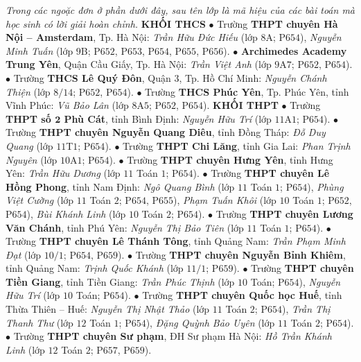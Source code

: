 \begin{multicols}{2}
	\textit{Trong các ngoặc đơn ở phần dưới đây, sau tên lớp là mã hiệu của các bài toán mà học sinh có lời giải hoàn chỉnh.}
	\vskip 0.05cm
	\textbf{\color{thachthuctoanhoc}KHỐI THCS}
	\vskip 0.05cm
	$\bullet$ Trường \textbf{\color{thachthuctoanhoc}THPT chuyên Hà Nội -- Amsterdam}, Tp. Hà Nội: \textit{Trần Hữu Đức Hiếu} (lớp $8$A; P$654$), \textit{Nguyễn Minh Tuấn} (lớp $9$B; P$652$, P$653$, P$654$, P$655$, P$656$).
	\vskip 0.05cm
	$\bullet$ \textbf{\color{thachthuctoanhoc}Archimedes Academy Trung Yên}, Quận Cầu Giấy, Tp. Hà Nội: \textit{Trần Việt Anh} (lớp $9$A$7$; P$652$, P$654$).
	\vskip 0.05cm
	$\bullet$ Trường \textbf{\color{thachthuctoanhoc}THCS Lê Quý Đôn}, Quận $3$, Tp. Hồ Chí Minh: \textit{Nguyễn Chánh Thiện} (lớp $8/14$; P$652$, P$654$).
	\vskip 0.05cm
	$\bullet$ Trường \textbf{\color{thachthuctoanhoc}THCS Phúc Yên}, Tp. Phúc Yên, tỉnh Vĩnh Phúc: \textit{Vũ Bảo Lân} (lớp $8$A$5$; P$652$, P$654$).
	\vskip 0.05cm
	\textbf{\color{thachthuctoanhoc}KHỐI THPT}
	\vskip 0.05cm
	$\bullet$ Trường \textbf{\color{thachthuctoanhoc}THPT số $\pmb{2}$ Phù Cát}, tỉnh Bình Định: \textit{Nguyễn Hữu Trí} (lớp $11$A$1$; P$654$).
	\vskip 0.05cm
	$\bullet$ Trường \textbf{\color{thachthuctoanhoc}THPT chuyên Nguyễn Quang Diêu}, tỉnh Đồng Tháp: \textit{Đỗ Duy Quang} (lớp $11$T$1$; P$654$).
	\vskip 0.05cm
	$\bullet$ Trường \textbf{\color{thachthuctoanhoc}THPT Chi Lăng}, tỉnh Gia Lai: \textit{Phan Trịnh Nguyên} (lớp $10$A$1$; P$654$).
	\vskip 0.05cm
	$\bullet$ Trường \textbf{\color{thachthuctoanhoc}THPT chuyên Hưng Yên}, tỉnh Hưng Yên: \textit{Trần Hữu Dương} (lớp $11$ Toán $1$; P$654$).
	\vskip 0.05cm
	$\bullet$ Trường \textbf{\color{thachthuctoanhoc}THPT chuyên Lê Hồng Phong}, tỉnh Nam Định: \textit{Ngô Quang Bình} (lớp $11$ Toán $1$; P$654$), \textit{Phùng Việt Cường} (lớp $11$ Toán $2$; P$654$, P$655$), \textit{Phạm Tuấn Khôi} (lớp $10$ Toán $1$; P$652$, P$654$), \textit{Bùi Khánh Linh} (lớp $10$ Toán $2$; P$654$).
	\vskip 0.05cm
	$\bullet$ Trường \textbf{\color{thachthuctoanhoc}THPT chuyên Lương Văn Chánh}, tỉnh Phú Yên: \textit{Nguyễn Thị Bảo Tiên} (lớp $11$ Toán $1$; P$654$).
	\vskip 0.05cm
	$\bullet$ Trường \textbf{\color{thachthuctoanhoc}THPT chuyên Lê Thánh Tông}, tỉnh Quảng Nam: \textit{Trần Phạm Minh Đạt} (lớp $10/1$; P$654$, P$659$).
	\vskip 0.05cm
	$\bullet$ Trường \textbf{\color{thachthuctoanhoc}THPT chuyên Nguyễn Bỉnh Khiêm}, tỉnh Quảng Nam: \textit{Trịnh Quốc Khánh} (lớp $11/1$; P$659$).
	\vskip 0.05cm
	$\bullet$ Trường \textbf{\color{thachthuctoanhoc}THPT chuyên Tiền Giang}, tỉnh Tiền Giang: \textit{Trần Phúc Thịnh} (lớp $10$ Toán; P$654$), \textit{Nguyễn Hữu Trí} (lớp $10$ Toán; P$654$).
	\vskip 0.05cm
	$\bullet$ Trường \textbf{\color{thachthuctoanhoc}THPT chuyên Quốc học Huế}, tỉnh Thừa Thiên -- Huế: \textit{Nguyễn Thị Nhật Thảo} (lớp $11$ Toán $2$; P$654$), \textit{Trần Thị Thanh Thư} (lớp $12$ Toán $1$; P$654$), \textit{Đặng Quỳnh Bảo Uyên} (lớp $11$ Toán $2$; P$654$).
	\vskip 0.05cm
	$\bullet$ Trường \textbf{\color{thachthuctoanhoc}THPT chuyên Sư phạm}, ĐH Sư phạm Hà Nội: \textit{Hồ Trần Khánh Linh} (lớp $12$ Toán $2$; P$657$, P$659$).
\end{multicols}
